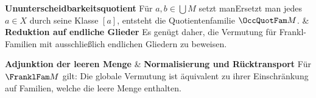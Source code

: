 \begin{BandUebersicht}
\textbf{Ununterscheidbarkeitsquotient}
Für \(a,b\in\bigcup M\) setzt manErsetzt man jedes \(a\in X\) durch seine Klasse \([a]\), entsteht
die Quotientenfamilie \(\OccQuotFam M\).
&
\textbf{Reduktion auf endliche Glieder}
Es genügt daher, die Vermutung für Frankl-Familien mit
ausschließlich endlichen Gliedern zu beweisen.
 \\
\addlinespace[.8ex]

\textbf{Adjunktion der leeren Menge}
&
\textbf{Normalisierung und Rücktransport}
Für \(\FranklFam M\) gilt:
Die globale Vermutung ist äquivalent zu ihrer Einschränkung
auf Familien, welche die leere Menge enthalten.
 \\
\addlinespace[.8ex]


\end{BandUebersicht}
